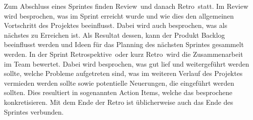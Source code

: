     Zum Abschluss eines Sprintes finden \glqq Review\grqq~und danach \glqq Retro\grqq~statt. Im Review wird besprochen, was im Sprint erreicht 
    wurde und wie dies den allgemeinen Vortschritt des Projektes beeinflusst. Dabei wird auch besprochen, was als nächstes zu Erreichen ist. 
    Als Resultat dessen, kann der Produkt Backlog beeinflusst werden und Ideen für das Planning des nächsten Sprintes gesammelt werden. 
    In der \glqq Sprint Retrospektive\grqq~oder kurz \glqq Retro\grqq~wird die Zusammenarbeit im Team bewertet. Dabei wird besprochen, was gut 
    lief und weitergeführt werden sollte, welche Probleme aufgetreten sind, was im weiteren Verlauf des Projektes vermieden werden sollte sowie 
    potentielle Neuerungen, die eingeführt werden sollten. Dies resultiert in sogenannten Action Items, welche das besprochene konkretisieren.
    Mit dem Ende der Retro ist üblicherweise auch das Ende des Sprintes verbunden.
